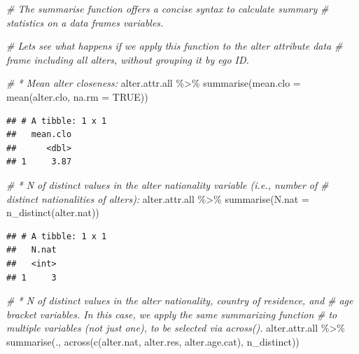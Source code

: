 \documentclass[
]{book}
\newenvironment{Shaded}{\begin{snugshade}}{\end{snugshade}}
\newcommand{\AttributeTok}[1]{\textcolor[rgb]{0.77,0.63,0.00}{#1}}
\newcommand{\CommentTok}[1]{\textcolor[rgb]{0.56,0.35,0.01}{\textit{#1}}}
\newcommand{\ConstantTok}[1]{\textcolor[rgb]{0.00,0.00,0.00}{#1}}
\newcommand{\FunctionTok}[1]{\textcolor[rgb]{0.00,0.00,0.00}{#1}}
\newcommand{\NormalTok}[1]{#1}
\newcommand{\SpecialCharTok}[1]{\textcolor[rgb]{0.00,0.00,0.00}{#1}}
\begin{document}
\begin{Shaded}
\begin{Highlighting}[]
\CommentTok{\# The summarise function offers a concise syntax to calculate summary }
\CommentTok{\# statistics on a data frame\textquotesingle{}s variables. }

\CommentTok{\# Let\textquotesingle{}s see what happens if we apply this function to the alter attribute data}
\CommentTok{\# frame including all alters, without grouping it by ego ID.}

\CommentTok{\# * Mean alter closeness:}
\NormalTok{alter.attr.all }\SpecialCharTok{\%\textgreater{}\%}
  \FunctionTok{summarise}\NormalTok{(}\AttributeTok{mean.clo =} \FunctionTok{mean}\NormalTok{(alter.clo, }\AttributeTok{na.rm =} \ConstantTok{TRUE}\NormalTok{))}
\end{Highlighting}
\end{Shaded}

\begin{verbatim}
## # A tibble: 1 x 1
##   mean.clo
##      <dbl>
## 1     3.87
\end{verbatim}

\begin{Shaded}
\begin{Highlighting}[]
\CommentTok{\# * N of distinct values in the alter nationality variable (i.e., number of }
\CommentTok{\# distinct nationalities of alters):}
\NormalTok{alter.attr.all }\SpecialCharTok{\%\textgreater{}\%}
  \FunctionTok{summarise}\NormalTok{(}\AttributeTok{N.nat =} \FunctionTok{n\_distinct}\NormalTok{(alter.nat))}
\end{Highlighting}
\end{Shaded}

\begin{verbatim}
## # A tibble: 1 x 1
##   N.nat
##   <int>
## 1     3
\end{verbatim}

\begin{Shaded}
\begin{Highlighting}[]
\CommentTok{\# * N of distinct values in the alter nationality, country of residence, and}
\CommentTok{\# age bracket variables. In this case, we apply the same summarizing function}
\CommentTok{\# to multiple variables (not just one), to be selected via across().}
\NormalTok{alter.attr.all }\SpecialCharTok{\%\textgreater{}\%}
  \FunctionTok{summarise}\NormalTok{(., }\FunctionTok{across}\NormalTok{(}\FunctionTok{c}\NormalTok{(alter.nat, alter.res, alter.age.cat), n\_distinct))}
\end{Highlighting}
\end{Shaded}
\end{document}

